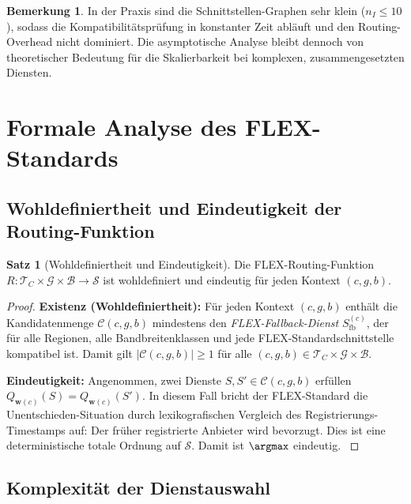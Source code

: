﻿\documentclass[a4paper,12pt]{article}
\theoremstyle{definition}
\newtheorem{satz}{Satz}
\newtheorem{bemerkung}{Bemerkung}
\begin{document}
\begin{bemerkung}
In der Praxis sind die Schnittstellen-Graphen sehr klein ($n_I \leq 10$), sodass die Kompatibilitätsprüfung in konstanter Zeit abläuft und den Routing-Overhead nicht dominiert. Die asymptotische Analyse bleibt dennoch von theoretischer Bedeutung für die Skalierbarkeit bei komplexen, zusammengesetzten Diensten.
\end{bemerkung}

\section{Formale Analyse des FLEX-Standards}
\label{sec:analyse}

\subsection{Wohldefiniertheit und Eindeutigkeit der Routing-Funktion}

\begin{satz}[Wohldefiniertheit und Eindeutigkeit]
\label{satz:eindeutigkeit}
Die FLEX-Routing-Funktion $R: \mathcal{T}_C \times \mathcal{G} \times \mathcal{B} \to \mathcal{S}$ ist wohldefiniert und eindeutig für jeden Kontext $(c, g, b)$.
\end{satz}

\begin{proof}
\textbf{Existenz (Wohldefiniertheit):} Für jeden Kontext $(c, g, b)$ enthält die Kandidatenmenge $\mathcal{C}(c, g, b)$ mindestens den \emph{FLEX-Fallback-Dienst} $S_\mathrm{fb}^{(c)}$, der für alle Regionen, alle Bandbreitenklassen und jede FLEX-Standardschnittstelle kompatibel ist. Damit gilt $|\mathcal{C}(c,g,b)| \geq 1$ für alle $(c,g,b) \in \mathcal{T}_C \times \mathcal{G} \times \mathcal{B}$.

\textbf{Eindeutigkeit:} Angenommen, zwei Dienste $S, S' \in \mathcal{C}(c,g,b)$ erfüllen $Q_{\mathbf{w}(c)}(S) = Q_{\mathbf{w}(c)}(S')$. In diesem Fall bricht der FLEX-Standard die Unentschieden-Situation durch lexikografischen Vergleich des Registrierungs-Timestamps auf: Der früher registrierte Anbieter wird bevorzugt. Dies ist eine deterministische totale Ordnung auf $\mathcal{S}$. Damit ist $\argmax$ eindeutig. $
$
\end{proof}

\subsection{Komplexität der Dienstauswahl}
\end{document}
